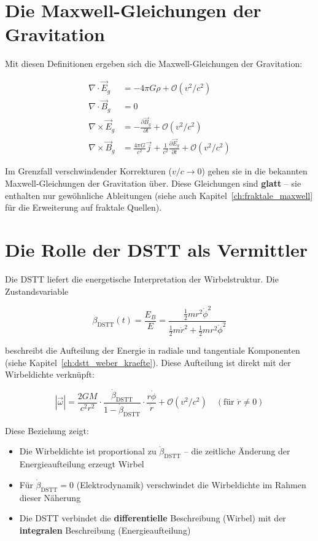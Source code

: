 \section{Die Maxwell-Gleichungen der Gravitation}
\label{sec:mg_gleichungen}

Mit diesen Definitionen ergeben sich die Maxwell-Gleichungen der Gravitation:

\[
\begin{aligned}
\nabla \cdot \vec{E}_g &= -4\pi G\rho + \mathcal{O}(v^2/c^2) \\
\nabla \cdot \vec{B}_g &= 0 \\
\nabla \times \vec{E}_g &= -\frac{\partial \vec{B}_g}{\partial t} + \mathcal{O}(v^2/c^2) \\
\nabla \times \vec{B}_g &= \frac{4\pi G}{c^2} \vec{j} + \frac{1}{c^2} \frac{\partial \vec{E}_g}{\partial t} + \mathcal{O}(v^2/c^2)
\end{aligned}
\]

Im Grenzfall verschwindender Korrekturen (\( v/c \to 0 \)) gehen sie in die bekannten Maxwell-Gleichungen der Gravitation über. Diese Gleichungen sind \textbf{glatt} – sie enthalten nur gewöhnliche Ableitungen (siehe auch Kapitel~\ref{ch:fraktale_maxwell} für die Erweiterung auf fraktale Quellen).

\section{Die Rolle der DSTT als Vermittler}
\label{sec:dstt_vermittler_mg}

Die DSTT liefert die energetische Interpretation der Wirbelstruktur. Die Zustandsvariable

\[
\beta_{\text{DSTT}}(t) = \frac{E_B}{E} = \frac{\frac{1}{2}mr^2\dot{\phi}^2}{\frac{1}{2}m\dot{r}^2 + \frac{1}{2}mr^2\dot{\phi}^2}
\]

beschreibt die Aufteilung der Energie in radiale und tangentiale Komponenten (siehe Kapitel~\ref{ch:dstt_weber_kraefte}). Diese Aufteilung ist direkt mit der Wirbeldichte verknüpft:

\[
|\vec{\omega}| = \frac{2GM}{c^2 r^2} \cdot \frac{\dot{\beta}_{\text{DSTT}}}{1 - \dot{\beta}_{\text{DSTT}}} \cdot \frac{r\dot{\phi}}{\dot{r}} + \mathcal{O}(v^2/c^2) \quad (\text{für } \dot{r} \neq 0)
\]

Diese Beziehung zeigt:

\begin{itemize}
    \item Die Wirbeldichte ist proportional zu \( \dot{\beta}_{\text{DSTT}} \) – die zeitliche Änderung der Energieaufteilung erzeugt Wirbel
    \item Für \( \dot{\beta}_{\text{DSTT}} = 0 \) (Elektrodynamik) verschwindet die Wirbeldichte im Rahmen dieser Näherung
    \item Die DSTT verbindet die \textbf{differentielle} Beschreibung (Wirbel) mit der \textbf{integralen} Beschreibung (Energieaufteilung)
\end{itemize}

